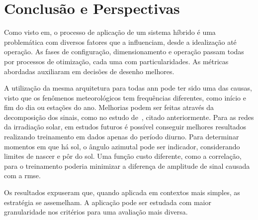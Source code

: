 \clearpage

\section{Conclusão e Perspectivas}

Como visto em, o processo de aplicação de um sistema híbrido é uma problemática
com diversos fatores que a influenciam, desde a idealização até operação.  As
fases de configuração, dimensionamento e operação passam todas por processos de
otimização, cada uma com particularidades.  As métricas abordadas auxiliaram em
decisões de desenho melhores.

A utilização da mesma arquitetura para todas \acrshort{ann} pode ter sido uma
das causas, visto que os fenômenos meteorológicos tem frequências diferentes,
como início e fim do dia ou estações do ano. Melhorias podem ser feitas através
da decomposição dos sinais, como no estudo de~\cite{Liu_2018}, citado
anteriormente.  Para as redes da irradiação solar, em estudos futuros é possível
conseguir melhores resultados realizando treinamento em dados apenas do período
diurno. Para determinar momentos em que há sol, o ângulo azimutal pode ser
indicador, considerando limites de nascer e pôr do sol. Uma função custo
diferente, como a correlação, para o treinamento poderia minimizar a diferença
de amplitude de sinal causada com a \acrshort{rmse}.

Os resultados expuseram que,  quando aplicada em contextos mais simples, as
estratégia se assemelham. A aplicação pode ser estudada com maior granularidade
nos critérios para uma avaliação mais diversa.
